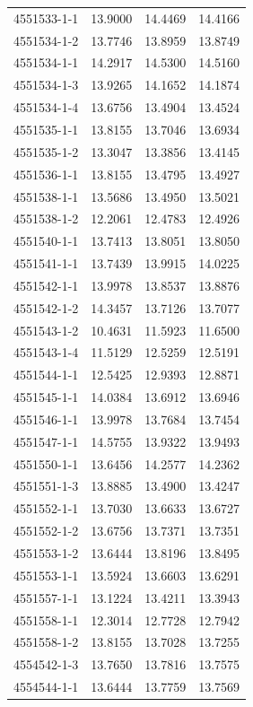\begin{longtable}{lrrr}
4551533-1-1 & 13.9000 & 14.4469 & 14.4166 \\
4551534-1-2 & 13.7746 & 13.8959 & 13.8749 \\
4551534-1-1 & 14.2917 & 14.5300 & 14.5160 \\
4551534-1-3 & 13.9265 & 14.1652 & 14.1874 \\
4551534-1-4 & 13.6756 & 13.4904 & 13.4524 \\
4551535-1-1 & 13.8155 & 13.7046 & 13.6934 \\
4551535-1-2 & 13.3047 & 13.3856 & 13.4145 \\
4551536-1-1 & 13.8155 & 13.4795 & 13.4927 \\
4551538-1-1 & 13.5686 & 13.4950 & 13.5021 \\
4551538-1-2 & 12.2061 & 12.4783 & 12.4926 \\
4551540-1-1 & 13.7413 & 13.8051 & 13.8050 \\
4551541-1-1 & 13.7439 & 13.9915 & 14.0225 \\
4551542-1-1 & 13.9978 & 13.8537 & 13.8876 \\
4551542-1-2 & 14.3457 & 13.7126 & 13.7077 \\
4551543-1-2 & 10.4631 & 11.5923 & 11.6500 \\
4551543-1-4 & 11.5129 & 12.5259 & 12.5191 \\
4551544-1-1 & 12.5425 & 12.9393 & 12.8871 \\
4551545-1-1 & 14.0384 & 13.6912 & 13.6946 \\
4551546-1-1 & 13.9978 & 13.7684 & 13.7454 \\
4551547-1-1 & 14.5755 & 13.9322 & 13.9493 \\
4551550-1-1 & 13.6456 & 14.2577 & 14.2362 \\
4551551-1-3 & 13.8885 & 13.4900 & 13.4247 \\
4551552-1-1 & 13.7030 & 13.6633 & 13.6727 \\
4551552-1-2 & 13.6756 & 13.7371 & 13.7351 \\
4551553-1-2 & 13.6444 & 13.8196 & 13.8495 \\
4551553-1-1 & 13.5924 & 13.6603 & 13.6291 \\
4551557-1-1 & 13.1224 & 13.4211 & 13.3943 \\
4551558-1-1 & 12.3014 & 12.7728 & 12.7942 \\
4551558-1-2 & 13.8155 & 13.7028 & 13.7255 \\
4554542-1-3 & 13.7650 & 13.7816 & 13.7575 \\
4554544-1-1 & 13.6444 & 13.7759 & 13.7569 \\

\end{longtable}
